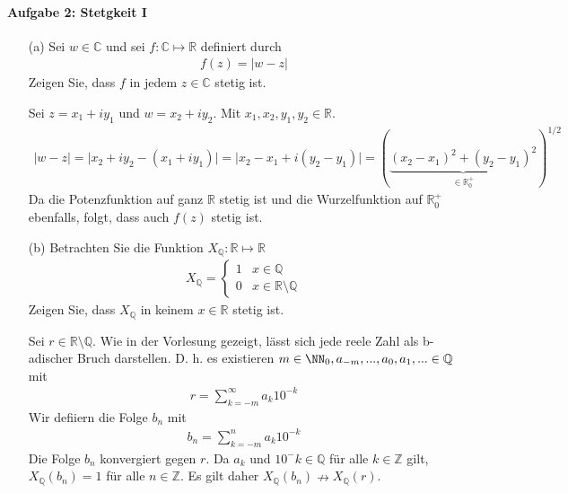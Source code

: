 	\paragraph{Aufgabe 2: Stetgkeit I }
	\begin{itemize}
		\item[(a)]
		Sei $ w \in \mathbb{ C } $ und sei $ f : \mathbb{ C } \mapsto \mathbb{ R } $ definiert durch
		\begin{align*}
			f(z) = \vert w - z \vert
		\end{align*}
		Zeigen Sie, dass $ f $ in jedem $ z \in \mathbb{ C } $ stetig ist.
		
		Sei $ z = x_1 + i y_ 1 $ und $ w = x_2 + i y_2 $.
		Mit $ x_1, x_2, y_1, y_2 \in \mathbb{ R } $.
		\begin{align*}
			\vert w - z \vert = \vert x_2 + i y_2 -  ( x_1 + i y_ 1 ) \vert = \vert x_2 - x_1 + i (y_2 - y_1) \vert
			= ( \underbrace{ (x_2 - x_1)^2  + (y_2 - y_1)^2 }_{\in \mathbb{ R }^+_0 } )^{1/2}
		\end{align*}
		Da die Potenzfunktion auf ganz $ \mathbb{ R } $ stetig ist und die Wurzelfunktion auf $ \mathbb{ R }^+_0 $ ebenfalls, folgt, dass auch $ f(z) $ stetig ist.
		
		
		\item[(b)] Betrachten Sie die Funktion $ X_{ \mathbb{ Q } } : \mathbb{ R } \mapsto \mathbb{ R }$
		\begin{align*}
			X_{ \mathbb{ Q } } =
			\left\lbrace  \begin{matrix}
				1 & x \in \mathbb{ Q }
				\\
				0 & x \in \mathbb{ R } \setminus \mathbb{ Q }
			\end{matrix} \right.
		\end{align*}
		Zeigen Sie, dass $ X_{ \mathbb{ Q } } $ in keinem $ x \in \mathbb{ R } $ stetig ist.

		Sei $ r \in \mathbb{ R } \setminus \mathbb{ Q } $.
		Wie in der Vorlesung gezeigt, lässt sich jede reele Zahl als b-adischer Bruch darstellen.
		D. h. es existieren $ m \in \NN_0, a_{-m}, ...,  a_0, a_1, ... \in \mathbb{ Q } $ mit
		\begin{align*}
			r = \sum_{ k = -m }^\infty a_k 10^{-k}
		\end{align*}
		Wir defiiern die Folge $ b_n $ mit
		\begin{align*}
			b_n = \sum_{ k = -m }^n a_k 10^{-k}
		\end{align*}
		Die Folge $ b_n $ konvergiert gegen $ r $.
		Da $ a_k $ und $ 10^-k \in \mathbb{ Q } $ für alle $ k \in \mathbb{ Z } $ gilt,
		 $ X_{ \mathbb{ Q } }( b_n ) = 1 $ für alle $ n \in \mathbb{ Z } $.
		Es gilt daher $ X_{ \mathbb{ Q } }( b_n ) \nrightarrow X_{ \mathbb{ Q } }( r ) $.


\end{itemize}
